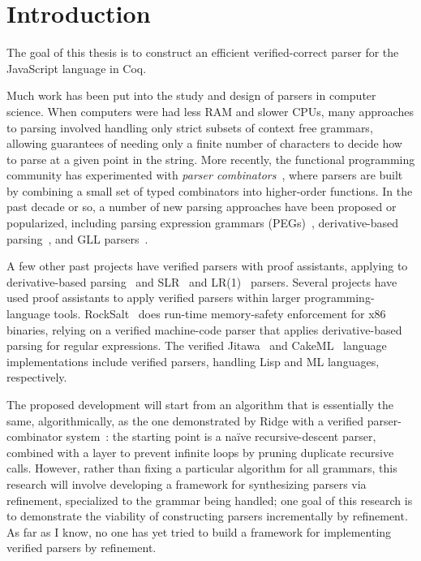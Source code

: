 \documentclass{article}
\begin{document}
\section{Introduction} \label{sec:related}
  The goal of this thesis is to construct an efficient verified-correct parser for the JavaScript language in Coq.
  
  Much work has been put into the study and design of parsers in computer science.  When computers were had less RAM and slower CPUs, many approaches to parsing involved handling only strict subsets of context free grammars, allowing guarantees of needing only a finite number of characters to decide how to parse at a given point in the string.  More recently, the functional programming community has experimented with \emph{parser combinators}~\cite{pcomb}, where parsers are built by combining a small set of typed combinators into higher-order functions.  In the past decade or so, a number of new parsing approaches have been proposed or popularized, including parsing expression grammars (PEGs)~\cite{PEG}, derivative-based parsing~\cite{Derivs}, and GLL parsers~\cite{GLL}.
  
  A few other past projects have verified parsers with proof assistants, applying to derivative-based parsing~\cite{DerivsCoq} and SLR~\cite{SLR} and LR(1)~\cite{LR1} parsers.  Several projects have used proof assistants to apply verified parsers within larger programming-language tools.  RockSalt~\cite{RockSalt} does run-time memory-safety enforcement for x86 binaries, relying on a verified machine-code parser that applies derivative-based parsing for regular expressions.  The verified Jitawa~\cite{Jitawa} and CakeML~\cite{CakeML} language implementations include verified parsers, handling Lisp and ML languages, respectively.
  
  The proposed development will start from an algorithm that is essentially the same, algorithmically, as the one demonstrated by Ridge with a verified parser-combinator system~\cite{Ridge}: the starting point is a na\"ive recursive-descent parser, combined with a layer to prevent infinite loops by pruning duplicate recursive calls.  However, rather than fixing a particular algorithm for all grammars, this research will involve developing a framework for synthesizing parsers via refinement, specialized to the grammar being handled; one goal of this research is to demonstrate the viability of constructing parsers incrementally by refinement.  As far as I know, no one has yet tried to build a framework for implementing verified parsers by refinement. %
    
\end{document}
